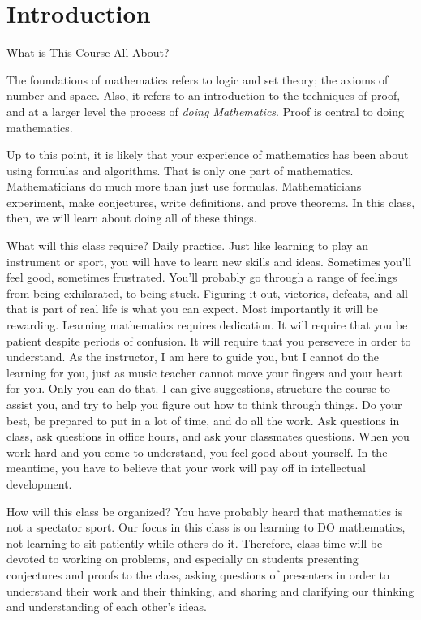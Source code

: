 \chapter{Introduction}\label{chap:intro}
\thispagestyle{empty}

\begin{section}{What is This Course All About?}%

The foundations of mathematics refers to logic and set theory; the axioms of number and space.  Also, it refers to an introduction to the techniques of proof, and at a larger level the process of \emph{doing Mathematics}.  Proof is central to doing mathematics.

Up to this point, it is likely that your experience of mathematics has been about using formulas and algorithms. That is only one part of mathematics. Mathematicians do much more than just use formulas.  Mathematicians experiment, make conjectures, write definitions, and prove theorems.  In this class, then, we will learn about doing all of these things.

What will this class require?  Daily practice.  Just like learning to play an instrument or sport, you will have to learn new skills and ideas.  Sometimes you'll feel good, sometimes frustrated.  You'll probably go through a range of feelings from being exhilarated, to being stuck.  Figuring it out, victories, defeats, and all that is part of real life is what you can expect.  Most importantly it will be rewarding.  Learning mathematics requires dedication.  It will require that you be patient despite periods of confusion.  It will require that you persevere in order to understand.  As the instructor, I am here to guide you, but I cannot do the learning for you, just as music teacher cannot move your fingers and your heart for you.  Only you can do that.  I can give suggestions, structure the course to assist you, and try to help you figure out how to think through things.  Do your best, be prepared to put in a lot of time, and do all the work.  Ask questions in class, ask questions in office hours, and ask your classmates questions.  When you work hard and you come to understand, you feel good about yourself.  In the meantime, you have to believe that your work will pay off in intellectual development.

How will this class be organized?  You have probably heard that mathematics is not a spectator sport.  Our focus in this class is on learning to DO mathematics, not learning to sit patiently while others do it.  Therefore, class time will be devoted to working on problems, and especially on students presenting conjectures and proofs to the class, asking questions of presenters in order to understand their work and their thinking, and sharing and clarifying our thinking and understanding of each other's ideas.  


\end{section}
